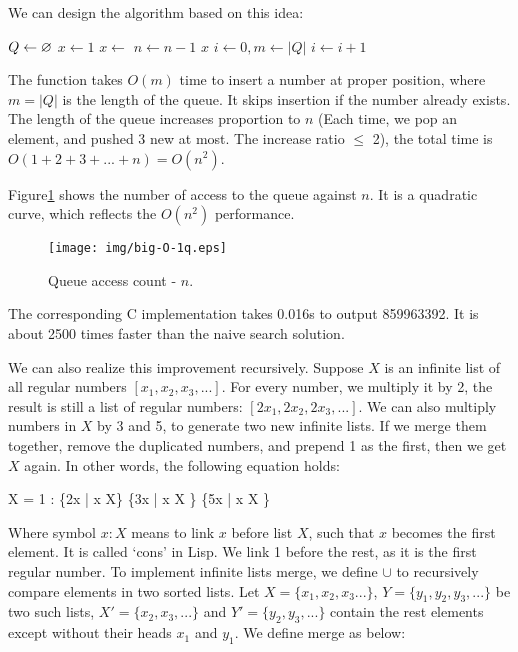 \documentclass[b5paper]{article}
\begin{document}
We can design the algorithm based on this idea:

\begin{algorithmic}[1]
  \State $Q \gets \varnothing$
  \State $x \gets 1$
  \State {}
    \State $x \gets$ 
    \State {}
    \State {}
    \State {}
    \State $n \gets n-1$
  \EndWhile
  \State \Return $x$
\EndFunction
\Statex
{}
  \State $i \gets 0, m \gets |Q|$
    \State $i \gets i + 1$
  \EndWhile
    \State {}
  \EndIf
\EndFunction
\end{algorithmic}

The  function takes $O(m)$ time to insert a number at proper position, where $m = |Q|$ is the length of the queue. It skips insertion if the number already exists. The length of the queue increases proportion to $n$ (Each time, we pop an element, and pushed 3 new at most. The increase ratio $\leq$ 2), the total time is $O(1 + 2 + 3 + ... + n) = O(n^2)$.

Figure\ref{fig:big-O-1q} shows the number of access to the queue against $n$. It is a quadratic curve, which reflects the $O(n^2)$ performance.

\begin{figure}[htbp]
  \centering
  \texttt{[image: img/big-O-1q.eps]}
  \caption{Queue access count - $n$.} \label{fig:big-O-1q}
\end{figure}

The corresponding C implementation takes 0.016s to output 859963392. It is about 2500 times faster than the naive search solution.

We can also realize this improvement recursively. Suppose $X$ is an infinite list of all regular numbers $[x_1, x_2, x_3, ...]$. For every number, we multiply it by 2, the result is still a list of regular numbers: $[2x_1, 2x_2, 2x_3, ...]$. We can also multiply numbers in $X$ by 3 and 5, to generate two new infinite lists. If we merge them together, remove the duplicated numbers, and prepend 1 as the first, then we get $X$ again. In other words, the following equation holds:

\be
  X = 1 : \{2x | \forall x \in X\} \cup \{3x | \forall x \in X \} \cup \{5x | \forall x \in X \}
\ee

Where symbol $x : X$ means to link $x$ before list $X$, such that $x$ becomes the first element. It is called `cons' in Lisp. We link 1 before the rest, as it is the first regular number. To implement infinite lists merge, we define $\cup$ to recursively compare elements in two sorted lists. Let $X=\{x_1, x_2, x_3...\}$, $Y=\{y_1, y_2, y_3, ...\}$ be two such lists, $X' = \{x_2, x_3, ...\}$ and $Y'=\{y_2, y_3, ...\}$ contain the rest elements except without their heads $x_1$ and $y_1$. We define merge as below:
\end{document}
